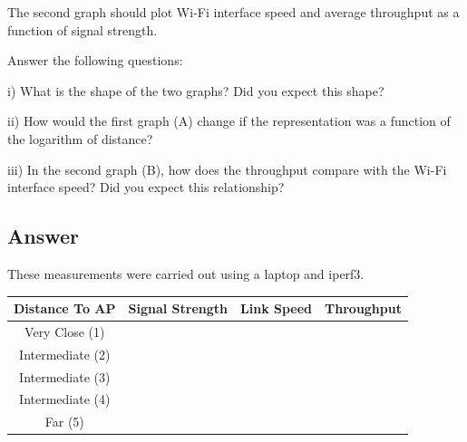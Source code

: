 \documentclass{article}
\begin{document}
The second graph should plot Wi-Fi interface speed and average throughput as a function of signal strength.

Answer the following questions:

i) What is the shape of the two graphs? Did you expect this shape?

ii) How would the first graph (A) change if the representation was a function of the logarithm of distance?

iii) In the second graph (B), how does the throughput compare with the Wi-Fi interface speed?
Did you expect this relationship?

\subsection{Answer}

These measurements were carried out using a laptop and iperf3.

\begin{center}
\begin{tabular}{| c | c | c | c |}
    \hline
     Distance To AP & Signal Strength & Link Speed & Throughput\\
     \hline
     Very Close (1) & & &  \\
     \hline
     Intermediate (2)& & & \\
     \hline
     Intermediate (3)& & & \\
     \hline
     Intermediate (4)& & & \\
     \hline
     Far (5) & & & \\
     \hline
\end{tabular} 
\end{center}
\end{document}

